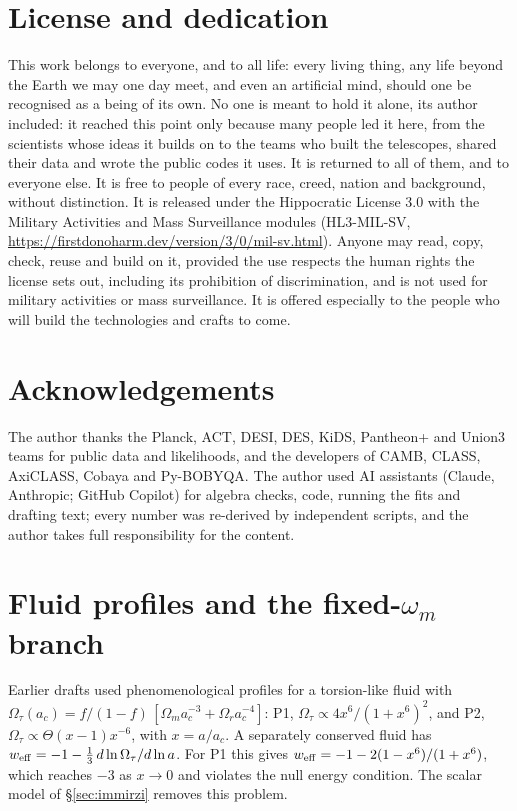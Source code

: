 \documentclass[11pt]{article}
\begin{document}
\section*{License and dedication}
This work belongs to everyone, and to all life: every living thing, any life beyond the Earth we may one
day meet, and even an artificial mind, should one be recognised as a being of its own. No one is meant to
hold it alone, its author included: it reached this
point only because many people led it here, from the scientists whose ideas it builds on to the teams who
built the telescopes, shared their data and wrote the public codes it uses. It is returned to all of
them, and to everyone else. It is free to people of every race, creed, nation and background, without
distinction. It is released under the Hippocratic License 3.0 with the Military Activities and Mass
Surveillance modules (HL3-MIL-SV, \url{https://firstdonoharm.dev/version/3/0/mil-sv.html}). Anyone may
read, copy, check, reuse and build on it, provided the use respects the human rights the license sets
out, including its prohibition of discrimination, and is not used for military activities or mass
surveillance. It is offered especially to the people who will build the technologies and crafts to come.

\section*{Acknowledgements}
The author thanks the Planck, ACT, DESI, DES, KiDS, Pantheon+ and Union3 teams for public data and
likelihoods, and the developers of CAMB, CLASS, AxiCLASS, Cobaya and Py-BOBYQA. The author used AI
assistants (Claude, Anthropic; GitHub Copilot) for algebra checks, code, running the fits and
drafting text; every number was re-derived by independent scripts, and the author takes full
responsibility for the content.

\appendix
\section{Fluid profiles and the fixed-$\omega_m$ branch}\label{app:pheno}
Earlier drafts used phenomenological profiles for a torsion-like fluid with
$\Omega_\tau(a_c)=f/(1-f)\,[\Omega_ma_c^{-3}+\Omega_ra_c^{-4}]$:
P1, $\Omega_\tau\propto4x^6/(1+x^6)^2$, and P2, $\Omega_\tau\propto\Theta(x-1)x^{-6}$, with
$x=a/a_c$. A separately conserved fluid has
$w_{\rm eff}=-1-\frac13\,d\ln\Omega_\tau/d\ln a$. For P1 this gives
$w_{\rm eff}=-1-2(1-x^6)/(1+x^6)$, which reaches $-3$ as $x\to0$ and violates the null
energy condition. The scalar model of \S\ref{sec:immirzi} removes this problem.
\end{document}
